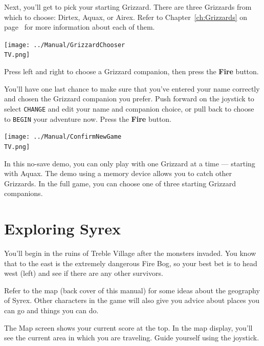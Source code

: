\documentclass[10pt,twocolumn,openany,article]{memoir}
\newcommand\TV{NTSC}
\newcommand\TV{PAL}
\newcommand\TV{SECAM}
\begin{document}
\else

Next,  you'll  get to  pick  your  starting  Grizzard. There  are  three
Grizzards  from which  to  choose:  Dirtex, Aquax,  or  Airex. Refer  to
Chapter~\ref{ch:Grizzards}   on  page~\pageref{ch:Grizzards}   for  more
information about each of them.

\begin{center}
  \texttt{[image: ../Manual/GrizzardChooser\\TV.png]}
\end{center}

Press left  and right  to choose  a Grizzard  companion, then  press the
\textbf{Fire} button.

You'll have one  last chance to make sure that  you've entered your name
correctly and chosen the Grizzard  companion you prefer. Push forward on
the joystick to select \texttt{CHANGE}  and edit your name and companion
choice, or  pull back  to choose to  \texttt{BEGIN} your  adventure now.
Press the \textbf{Fire} button.

\begin{center}
  \texttt{[image: ../Manual/ConfirmNewGame\\TV.png]}
\end{center}

\fi
\fi
\ifdefined\NOSAVE

In this no-save demo, you can only  play with one Grizzard at a time ---
starting with Aquax. The demo using  a memory device allows you to catch
other Grizzards. In the full game,  you can choose one of three starting
Grizzard companions.

\fi

\section{Exploring Syrex}

You'll begin in the ruins of  Treble Village after the monsters invaded.
You know that to  the east is the extremely dangerous  Fire Bog, so your
best  bet   is  to  head   west  (left)  and   see  if  there   are  any
other survivors.

Refer to the  map (back cover of  this manual) for some  ideas about the
geography of  Syrex. Other  characters in  the game  will also  give you
advice about places you can go and things you can do.

The Map screen shows your current score  at the top. In the map display,
you'll see the  current area in which you are  traveling. Guide yourself
using the joystick.
\end{document}
